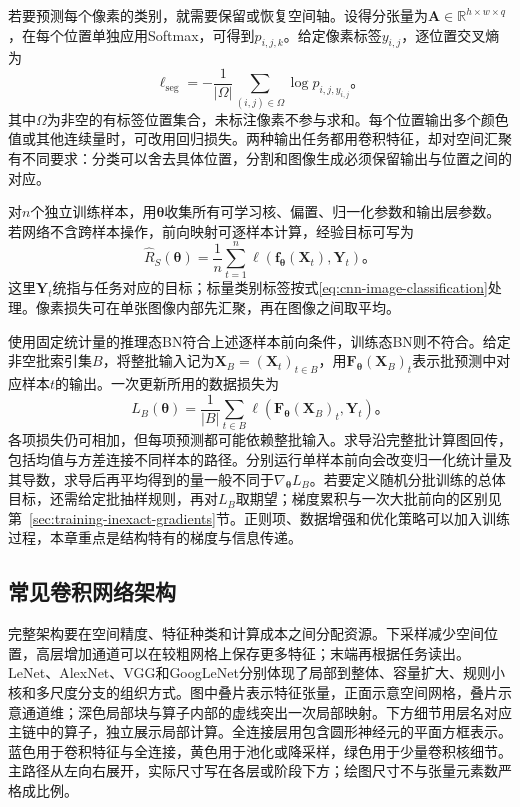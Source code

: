 若要预测每个像素的类别，就需要保留或恢复空间轴。设得分张量为$\bm A\in\mathbb R^{h\times w\times q}$，在每个位置单独应用Softmax，可得到$p_{i,j,k}$。给定像素标签$y_{i,j}$，逐位置交叉熵为
\begin{equation}
  \ell_{\mathrm{seg}}=-\frac1{|\Omega|}
    \sum_{(i,j)\in\Omega}\log p_{i,j,y_{i,j}}\text{。}
  \label{eq:cnn-segmentation-loss}
\end{equation}
其中$\Omega$为非空的有标签位置集合，未标注像素不参与求和。每个位置输出多个颜色值或其他连续量时，可改用回归损失。两种输出任务都用卷积特征，却对空间汇聚有不同要求：分类可以舍去具体位置，分割和图像生成必须保留输出与位置之间的对应。

对$n$个独立训练样本，用$\bm\theta$收集所有可学习核、偏置、归一化参数和输出层参数。若网络不含跨样本操作，前向映射可逐样本计算，经验目标可写为
\begin{equation}
  \widehat R_S(\bm\theta)=\frac1n\sum_{t=1}^{n}
    \ell\!\left(\bm f_{\bm\theta}(\bm X_t),\bm Y_t\right)\text{。}
  \label{eq:cnn-training-objective}
\end{equation}
这里$\bm Y_t$统指与任务对应的目标；标量类别标签按式\eqref{eq:cnn-image-classification}处理。像素损失可在单张图像内部先汇聚，再在图像之间取平均。

使用固定统计量的推理态BN符合上述逐样本前向条件，训练态BN则不符合。给定非空批索引集$B$，将整批输入记为$\bm X_B=(\bm X_t)_{t\in B}$，用$\bm F_{\bm\theta}(\bm X_B)_t$表示批预测中对应样本$t$的输出。一次更新所用的数据损失为
\begin{equation}
  L_B(\bm\theta)=\frac1{|B|}\sum_{t\in B}
    \ell\!\left(\bm F_{\bm\theta}(\bm X_B)_t,\bm Y_t\right)\text{。}
  \label{eq:cnn-batch-objective}
\end{equation}
各项损失仍可相加，但每项预测都可能依赖整批输入。求导沿完整批计算图回传，包括均值与方差连接不同样本的路径。分别运行单样本前向会改变归一化统计量及其导数，求导后再平均得到的量一般不同于$\nabla_{\bm\theta}L_B$。若要定义随机分批训练的总体目标，还需给定批抽样规则，再对$L_B$取期望；梯度累积与一次大批前向的区别见第~\ref{sec:training-inexact-gradients}节。正则项、数据增强和优化策略可以加入训练过程，本章重点是结构特有的梯度与信息传递。

\FloatBarrier

\subsection{常见卷积网络架构}
\label{sec:cnn-classic-architectures}

完整架构要在空间精度、特征种类和计算成本之间分配资源。下采样减少空间位置，高层增加通道可以在较粗网格上保存更多特征；末端再根据任务读出。LeNet、AlexNet、VGG和GoogLeNet分别体现了局部到整体、容量扩大、规则小核和多尺度分支的组织方式。图中叠片表示特征张量，正面示意空间网格，叠片示意通道维；深色局部块与算子内部的虚线突出一次局部映射。下方细节用层名对应主链中的算子，独立展示局部计算。全连接层用包含圆形神经元的平面方框表示。蓝色用于卷积特征与全连接，黄色用于池化或降采样，绿色用于少量卷积核细节。主路径从左向右展开，实际尺寸写在各层或阶段下方；绘图尺寸不与张量元素数严格成比例。


